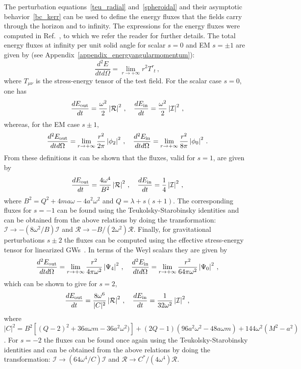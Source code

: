 \documentclass[11pt]{article}
\newcommand{\be}{\begin{equation}}
\newcommand{\ee}{\end{equation}}
\numberwithin{equation}{section} %
\begin{document}
The perturbation equations~\eqref{teu_radial} and~\eqref{spheroidal} and their asymptotic behavior~\eqref{bc_kerr} can be used to define the energy fluxes that the fields carry through the horizon and to infinity. The expressions for the energy fluxes were computed in Ref.~\cite{Teukolsky:1974yv}, to which we refer the reader for further details.  
The total energy fluxes at infinity per unit solid angle for scalar $s=0$ and EM $s=\pm 1$ are given by (see 
Appendix~\ref{appendix_energyangularmomentum}):
%
\be
\frac{d^2E}{dtd\Omega}=\lim_{r\to +\infty} r^2 T^r_{\phantom{r}t}\,,
\ee
% 
where $T_{\mu\nu}$ is the stress-energy tensor of the test field.
%
For the scalar case $s=0$, one has
%
\be
\frac{dE_{\rm out}}{dt}=\frac{\omega^2}{2}\left|\mathcal{R}\right|^2\,,
\quad \frac{dE_{\rm in}}{dt}=\frac{\omega^2}{2}\left|\mathcal{I}\right|^2\,,\label{flux_scalar}
\ee
% 
whereas, for the EM case $s\pm 1$,
%
\be
\frac{d^2E_{\rm out}}{dtd\Omega}=\lim_{r\to +\infty} \frac{r^2}{2\pi}\left|\phi_2\right|^2\,,\quad
\frac{d^2E_{\rm in}}{dtd\Omega}=\lim_{r\to +\infty} \frac{r^2}{8\pi}\left|\phi_0\right|^2\,.%
\ee
%
From these definitions it can be shown that the fluxes, valid for $s=1$, are given by
\be
\frac{dE_{\rm out}}{dt}=\frac{4\omega^4}{B^2}\left|\mathcal{R}\right|^2\,,\quad
\frac{dE_{\rm in}}{dt}=\frac{1}{4}\left|\mathcal{I}\right|^2\,,\label{flux_elec}
\ee
% 
where $B^2=Q^2+4ma\omega-4a^2\omega^2$ and $Q=\lambda+s(s+1)$. The corresponding fluxes for $s=-1$ can be found using the Teukolsky-Starobinsky identities and can be obtained from the above relations by doing the transformation: $\mathcal{I}\to -(8\omega^2/B) \mathcal{I}$ and $\mathcal{R}\to -B/(2\omega^2)\mathcal{R}$.
Finally, for gravitational perturbations $s\pm 2$ the fluxes can be computed using the effective stress-energy tensor 
for linearized GWs~\cite{Misner:1974qy}. In terms of the Weyl scalars they are given by 
%
\be
\frac{d^2E_{\rm out}}{dtd\Omega}=\lim_{r\to +\infty} \frac{r^2}{4\pi\omega^2}\left|\Psi_4\right|^2\,,\quad
\frac{d^2E_{\rm in}}{dtd\Omega}=\lim_{r\to +\infty} \frac{r^2}{64\pi\omega^2}\left|\Psi_0\right|^2\,,
\ee
% 
which can be shown to give for $s=2$,
\be
\frac{dE_{\rm out}}{dt}
=\frac{8\omega^6}{|C|^2}\left|\mathcal{R}\right|^2\,,\quad
\frac{dE_{\rm in}}{dt}=\frac{1}{32\omega^2}\left|\mathcal{I}\right|^2\,,\label{flux_grav}
\ee
%
where $\left|C\right|^2=B^2\left[(Q-2)^2+36a\omega m-36a^2\omega^2)\right]+(2Q-1)(96a^2\omega^2-48a\omega m)+144\omega^2(M^2-a^2)$. For $s=-2$ the fluxes can be found once again using the Teukolsky-Starobinsky identities and can be obtained from the above relations by doing the transformation: $\mathcal{I}\to (64\omega^4/C) \mathcal{I}$ and $\mathcal{R}\to C^*/(4\omega^4)\mathcal{R}$.
\end{document}
